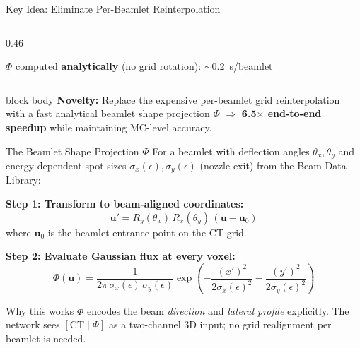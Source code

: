 \documentclass[aspectratio=169, 10pt]{beamer}
\begin{document}
\begin{frame}{Key Idea: Eliminate Per-Beamlet Reinterpolation}
\begin{columns}[T]
\begin{column}{0.46\textwidth}
\begin{center}
        \vspace{2pt}
        {\scriptsize\color{tudelft!80!black}
         $\Phi$ computed \textbf{analytically} (no grid rotation):
         $\sim$\SI{0.2}{s}/beamlet}
      \end{center}
    \end{column}
  \end{columns}

  \vspace{4pt}
  \centering
  \begin{beamercolorbox}[wd=0.88\textwidth, rounded=true, shadow=true,
    sep=3pt]{block body}
    \centering\small
    \textbf{Novelty:} Replace the expensive per-beamlet grid
    reinterpolation with a fast analytical beamlet shape projection
    $\Phi$ $\Rightarrow$ \textbf{6.5$\times$ end-to-end speedup}
    while maintaining MC-level accuracy.
  \end{beamercolorbox}
\end{frame}

\begin{frame}{The Beamlet Shape Projection $\Phi$}
  For a beamlet with deflection angles $\theta_x, \theta_y$ and
  energy-dependent spot sizes $\sigma_x(\epsilon), \sigma_y(\epsilon)$
  (nozzle exit) from the Beam Data Library:

  \vspace{4pt}
  \textbf{Step 1: Transform to beam-aligned coordinates:}
  \[
    \mathbf{u}' = R_y(\theta_x)\, R_x(\theta_y)\,
    (\mathbf{u} - \mathbf{u}_0)
  \]
  where $\mathbf{u}_0$ is the beamlet entrance point on the CT grid.

  \vspace{4pt}
  \textbf{Step 2: Evaluate Gaussian flux at every voxel:}
  \[
    \Phi(\mathbf{u}) = \frac{1}{2\pi\,\sigma_x(\epsilon)\,\sigma_y(\epsilon)}
    \exp\!\left(
      -\frac{(x')^2}{2\sigma_x(\epsilon)^2}
      -\frac{(y')^2}{2\sigma_y(\epsilon)^2}
    \right)
  \]

  \vspace{4pt}
  \begin{block}{Why this works}
    $\Phi$ encodes the beam \emph{direction} and \emph{lateral profile}
    explicitly.  The network sees $[\text{CT} \mid \Phi]$ as a
    two-channel 3D input; no grid realignment per beamlet is needed.
  \end{block}
\end{frame}
\end{document}
